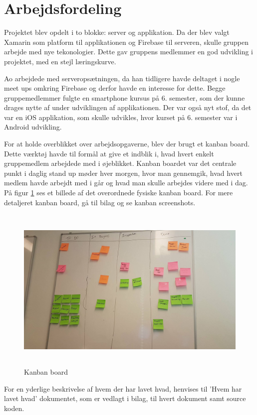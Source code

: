 \section{Arbejdsfordeling}
Projektet blev opdelt i to blokke: server og applikation. Da der blev valgt Xamarin som platform til applikationen og Firebase til serveren, skulle gruppen arbejde med nye tekonologier. Dette gav gruppens medlemmer en god udvikling i projektet, med en stejl læringskurve.

Ao arbejdede med serveropsætningen, da han tidligere havde deltaget i nogle meet ups omkring Firebase og derfor havde en interesse for dette. Begge gruppemedlemmer fulgte en smartphone kursus på 6. semester, som der kunne drages nytte af under udviklingen af applikationen. Der var også nyt stof, da det var en iOS applikation, som skulle udvikles, hvor kurset på 6. semester var i Android udvikling. 

For at holde overblikket over arbejdsopgaverne, blev der brugt et kanban board. Dette værktøj havde til formål at give et indblik i, hvad hvert enkelt gruppemedlem arbejdede med i øjeblikket. Kanban boardet var det centrale punkt i daglig stand up møder hver morgen, hvor man gennemgik, hvad hvert medlem havde arbejdt med i går og hvad man skulle arbejdes videre med i dag. \\
På figur \ref{fig:Kanbanboard} ses et billede af det overordnede fysiske kanban board. For mere detaljeret kanban board, gå til bilag og se kanban screenshots. \\

\begin{figure} [H]
	\begin{center}
		\includegraphics[height=8cm, width=12cm]{Arbejdsfordeling/ScrumBoard}
	\end{center}
	\caption{Kanban board}
	\label{fig:Kanbanboard}
\end{figure}

For en yderlige beskrivelse af hvem der har lavet hvad, henvises til 'Hvem har lavet hvad' dokumentet, som er vedlagt i bilag, til hvert dokument samt source koden.

\clearpage